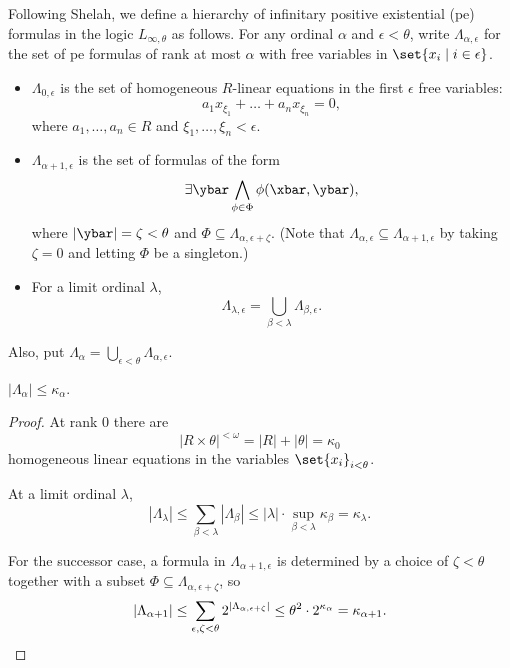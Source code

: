 \documentclass[11pt]{article}
\begin{document}
Following Shelah, we define a hierarchy of infinitary positive existential (pe) formulas in the logic $L_{\infty,\theta}$ as follows. For any ordinal $\alpha$ and $\epsilon < \theta$, write $\Lambda_{\alpha,\epsilon}$ for the set of pe formulas of rank at most $\alpha$ with free variables in $\set{x_i \mid i \in \epsilon}$.
\begin{itemize}
    \item $\Lambda_{0,\epsilon}$ is the set of homogeneous $R$-linear equations in the first $\epsilon$ free variables:
        \[ a_1 x_{\xi_1} + \dots + a_n x_{\xi_n} = 0, \]
    where $a_1,\dots,a_n \in R$ and $\xi_1,\dots,\xi_n < \epsilon$.
    
    \item $\Lambda_{\alpha+1,\epsilon}$ is the set of formulas of the form 
    \[ 
        \exists \ybar \bigwedge_{\phi \in \Phi} \phi(\xbar,\ybar), 
    \]
    where $|\ybar| = \zeta < \theta$ and $\Phi \subseteq \Lambda_{\alpha, \epsilon+\zeta}$. (Note that $\Lambda_{\alpha,\epsilon} \subseteq \Lambda_{\alpha+1,\epsilon}$ by taking $\zeta = 0$ and letting $\Phi$ be a singleton.)
    
    \item For a limit ordinal $\lambda$, 
    \[ \Lambda_{\lambda,\epsilon} = \bigcup_{\beta < \lambda} \Lambda_{\beta,\epsilon}. \]
\end{itemize}

Also, put $\Lambda_\alpha = \bigcup_{\epsilon < \theta} \Lambda_{\alpha,\epsilon}$.

\begin{proposition}
    $|\Lambda_\alpha| \leq \kappa_\alpha$.
\end{proposition}

\begin{proof}
    At rank $0$ there are 
    \[ 
        |R \times \theta|^{<\omega} = |R| + |\theta| = \kappa_0
    \]
    homogeneous linear equations in the variables $\set{x_i}_{i < \theta}$.

    At a limit ordinal $\lambda$, 
    \[ 
    |\Lambda_\lambda| 
    \leq \sum_{\beta < \lambda} |\Lambda_{\beta}| 
    \leq |\lambda| \cdot \sup_{\beta < \lambda} \kappa_\beta 
    = \kappa_\lambda. 
    \]

    For the successor case, a formula in $\Lambda_{\alpha+1,\epsilon}$ is determined by a choice of $\zeta < \theta$ together with a subset $\Phi \subseteq \Lambda_{\alpha,\epsilon+\zeta}$, so
    \[
        |\Lambda_{\alpha+1}| 
        \leq \sum_{\epsilon,\zeta < \theta} 2^{|\Lambda_{\alpha,\epsilon+\zeta}|}
        \leq \theta^2 \cdot 2^{\kappa_\alpha} 
        = \kappa_{\alpha+1}. \qedhere
    \]
\end{proof}
\end{document}
